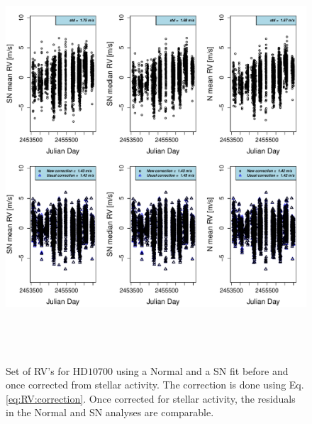 \documentclass{aa}
\begin{document}
\begin{figure} 
\begin{center}
\includegraphics[height = 6in]{NEW_CORRECTIONHD10700_[3]CorrectionActivity_RadialVelocity_vs_time.pdf} 
   \caption{Set of RV's for $\text{HD}10700$  using a Normal and a SN fit before and once corrected from stellar activity. The correction is done using Eq. \ref{eq:RV:correction}. Once corrected for stellar activity, the residuals in the Normal and SN analyses are comparable.}
   \label{fig:HD10700:correctionRV}
\end{center}
\end{figure}
\end{document}
